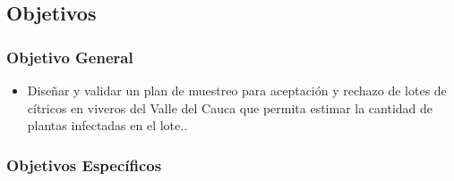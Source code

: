 



\subsection{Objetivos}
\subsubsection{Objetivo General}
\begin{itemize}
\item Dise\~{n}ar y validar un plan de muestreo para aceptaci\'{o}n y rechazo de lotes de c\'{i}tricos en viveros del Valle del Cauca que permita estimar la cantidad de plantas infectadas en el lote..
\end{itemize}
\subsubsection{Objetivos Espec\'{i}ficos}

